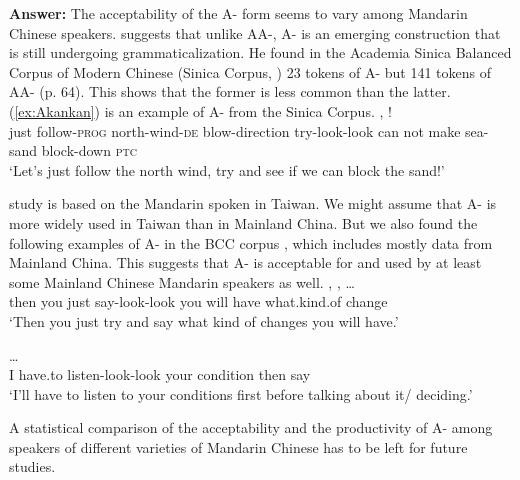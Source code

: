 \documentclass[fleqn,twoside]{article}
\begin{document}
\begin{enumerate}
\textbf{Answer:}
The acceptability of the A- form seems to vary among Mandarin Chinese speakers.
\citet[73]{Cheng2012} suggests that unlike AA-, A- is an emerging construction that is still undergoing grammaticalization.
He found in the Academia Sinica Balanced Corpus of Modern Chinese (Sinica Corpus, \citealt{sinica}) 23 tokens of A- but 141 tokens of AA- (p. 64).
This shows that the former is less common than the latter.
(\ref{ex:Akankan}) is an example of A- from the Sinica Corpus.
\ea\label{ex:Akankan} %
\gll {}   ,       !\\
just follow-\textsc{prog} north-wind-\textsc{de} blow-direction try-look-look can not make sea-sand block-down \textsc{ptc}\\
\glt `Let's just follow the north wind, try and see if we can block the sand!'
\z 

 study is based on the Mandarin spoken in Taiwan.
We might assume that A- is more widely used in Taiwan than in Mainland China.
But we also found the following examples of A- in the BCC corpus \citep{BCC}, which includes mostly data from Mainland China.
This suggests that A- is acceptable for and used by at least some Mainland Chinese Mandarin speakers as well.
\ea %
\gll {},   ,     \ldots\\
then you just say-look-look you will have what.kind.of change\\
\glt `Then you just try and say what kind of changes you will have.'
\z

\ea %
\gll {}      \ldots\\
I have.to listen-look-look your condition then say\\
\glt `I'll have to listen to your conditions first before talking about it/ deciding.'
\z

A statistical comparison of the acceptability and the productivity of A- among speakers of different varieties of Mandarin Chinese has to be left for future studies.


\end{enumerate}
\end{document}
